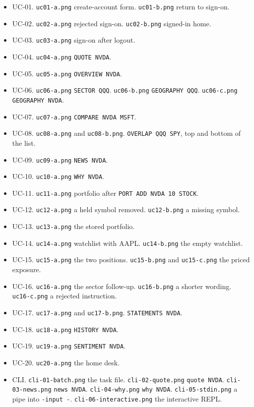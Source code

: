 \documentclass[11pt]{article}
\begin{document}
\begin{itemize}
\item UC-01. \texttt{uc01-a.png} create-account form. \texttt{uc01-b.png} return to sign-on.
\item UC-02. \texttt{uc02-a.png} rejected sign-on. \texttt{uc02-b.png} signed-in home.
\item UC-03. \texttt{uc03-a.png} sign-on after logout.
\item UC-04. \texttt{uc04-a.png} \texttt{QUOTE NVDA}.
\item UC-05. \texttt{uc05-a.png} \texttt{OVERVIEW NVDA}.
\item UC-06. \texttt{uc06-a.png} \texttt{SECTOR QQQ}. \texttt{uc06-b.png} \texttt{GEOGRAPHY QQQ}. \texttt{uc06-c.png} \texttt{GEOGRAPHY NVDA}.
\item UC-07. \texttt{uc07-a.png} \texttt{COMPARE NVDA MSFT}.
\item UC-08. \texttt{uc08-a.png} and \texttt{uc08-b.png}. \texttt{OVERLAP QQQ SPY}, top and bottom of the list.
\item UC-09. \texttt{uc09-a.png} \texttt{NEWS NVDA}.
\item UC-10. \texttt{uc10-a.png} \texttt{WHY NVDA}.
\item UC-11. \texttt{uc11-a.png} portfolio after \texttt{PORT ADD NVDA 10 STOCK}.
\item UC-12. \texttt{uc12-a.png} a held symbol removed. \texttt{uc12-b.png} a missing symbol.
\item UC-13. \texttt{uc13-a.png} the stored portfolio.
\item UC-14. \texttt{uc14-a.png} watchlist with AAPL. \texttt{uc14-b.png} the empty watchlist.
\item UC-15. \texttt{uc15-a.png} the two positions. \texttt{uc15-b.png} and \texttt{uc15-c.png} the priced exposure.
\item UC-16. \texttt{uc16-a.png} the sector follow-up. \texttt{uc16-b.png} a shorter wording. \texttt{uc16-c.png} a rejected instruction.
\item UC-17. \texttt{uc17-a.png} and \texttt{uc17-b.png}. \texttt{STATEMENTS NVDA}.
\item UC-18. \texttt{uc18-a.png} \texttt{HISTORY NVDA}.
\item UC-19. \texttt{uc19-a.png} \texttt{SENTIMENT NVDA}.
\item UC-20. \texttt{uc20-a.png} the home desk.
\item CLI. \texttt{cli-01-batch.png} the task file. \texttt{cli-02-quote.png} \texttt{quote NVDA}. \texttt{cli-03-news.png} \texttt{news NVDA}. \texttt{cli-04-why.png} \texttt{why NVDA}. \texttt{cli-05-stdin.png} a pipe into \texttt{-input -}. \texttt{cli-06-interactive.png} the interactive REPL.
\end{itemize}
\end{document}
